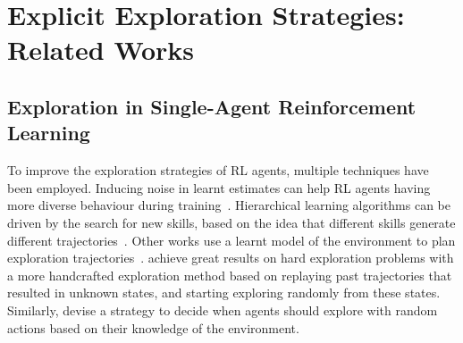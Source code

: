 
\section{Explicit Exploration Strategies: Related Works}\label{sec:JIM:RelatedWorks}


\subsection{Exploration in Single-Agent Reinforcement Learning}

To improve the exploration strategies of RL agents, multiple techniques have been employed. Inducing noise in learnt estimates can help RL agents having more diverse behaviour during training~\citep{Osband2016_BootstrappedDQN, Fortunato2018_NoisyDQN, Plappert2018_Noise, Osband2018_RandomizedValue, Chiappa2023_Lattice}. Hierarchical learning algorithms can be driven by the search for new skills, based on the idea that different skills generate different trajectories~\citep{Gregor2017_VIC, Eysenbach2019_DIAYN, Gehring2021_HierarchicalSkills}. Other works use a learnt model of the environment to plan exploration trajectories~\citep{Shyam2019_MAX, Sekar2020_Plan2Explore, Hu2023_PlanGoalExplore}. \cite{Ecoffet2021_GoExplore} achieve great results on hard exploration problems with a more handcrafted exploration method based on replaying past trajectories that resulted in unknown states, and starting exploring randomly from these states. Similarly, \cite{Pislar2022_WhenExplore} devise a strategy to decide when agents should explore with random actions based on their knowledge of the environment. 

